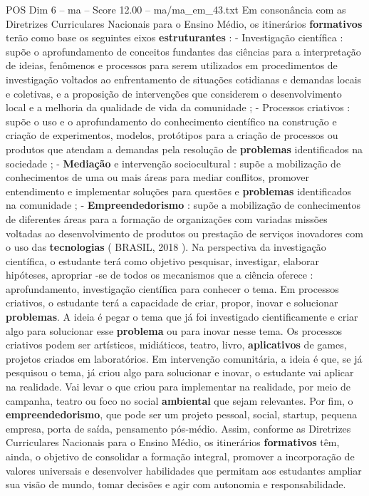 \begin{textsample}{POS Dim 6 – ma – Score 12.00 – ma/ma\_em\_43.txt}
Em consonância com as Diretrizes Curriculares Nacionais para o Ensino Médio, os itinerários \textbf{formativos} terão como base os seguintes eixos \textbf{estruturantes} : - Investigação científica : supõe o aprofundamento de conceitos fundantes das ciências para a interpretação de ideias, fenômenos e processos para serem utilizados em procedimentos de investigação voltados ao enfrentamento de situações cotidianas e demandas locais e coletivas, e a proposição de intervenções que considerem o desenvolvimento local e a melhoria da qualidade de vida da comunidade ; - Processos criativos : supõe o uso e o aprofundamento do conhecimento científico na construção e criação de experimentos, modelos, protótipos para a criação de processos ou produtos que atendam a demandas pela resolução de \textbf{problemas} identificados na sociedade ; - \textbf{Mediação} e intervenção sociocultural : supõe a mobilização de conhecimentos de uma ou mais áreas para mediar conflitos, promover entendimento e implementar soluções para questões e \textbf{problemas} identificados na comunidade ; - \textbf{Empreendedorismo} : supõe a mobilização de conhecimentos de diferentes áreas para a formação de organizações com variadas missões voltadas ao desenvolvimento de produtos ou prestação de serviços inovadores com o uso das \textbf{tecnologias} ( BRASIL, 2018 ).
Na perspectiva da investigação científica, o estudante terá como objetivo pesquisar, investigar, elaborar hipóteses, apropriar -se de todos os mecanismos que a ciência oferece : aprofundamento, investigação científica para conhecer o tema.
Em processos criativos, o estudante terá a capacidade de criar, propor, inovar e solucionar \textbf{problemas}.
A ideia é pegar o tema que já foi investigado cientificamente e criar algo para solucionar esse \textbf{problema} ou para inovar nesse tema.
Os processos criativos podem ser artísticos, midiáticos, teatro, livro, \textbf{aplicativos} de games, projetos criados em laboratórios.
Em intervenção comunitária, a ideia é que, se já pesquisou o tema, já criou algo para solucionar e inovar, o estudante vai aplicar na realidade.
Vai levar o que criou para implementar na realidade, por meio de campanha, teatro ou foco no social \textbf{ambiental} que sejam relevantes.
Por fim, o \textbf{empreendedorismo}, que pode ser um projeto pessoal, social, startup, pequena empresa, porta de saída, pensamento pós-médio.
Assim, conforme as Diretrizes Curriculares Nacionais para o Ensino Médio, os itinerários \textbf{formativos} têm, ainda, o objetivo de consolidar a formação integral, promover a incorporação de valores universais e desenvolver habilidades que permitam aos estudantes ampliar sua visão de mundo, tomar decisões e agir com autonomia e responsabilidade.

\end{textsample}
